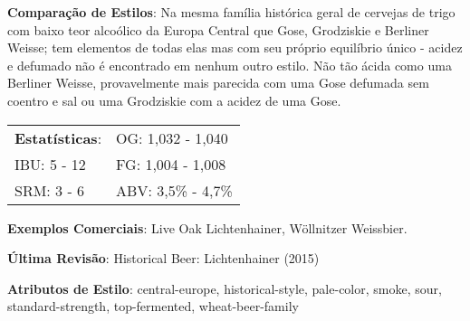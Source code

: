 \textbf{Comparação de Estilos}: Na mesma família histórica geral de cervejas de trigo com baixo teor alcoólico da Europa Central que Gose, Grodziskie e Berliner Weisse; tem elementos de todas elas mas com seu próprio equilíbrio único - acidez e defumado não é encontrado em nenhum outro estilo. Não tão ácida como uma Berliner Weisse, provavelmente mais parecida com uma Gose defumada sem coentro e sal ou uma Grodziskie com a acidez de uma Gose.

\begin{tabular}{@{}p{35mm}p{35mm}@{}}
  \textbf{Estatísticas}: & OG: 1,032 - 1,040  \\
  IBU: 5 - 12  & FG: 1,004 - 1,008  \\
  SRM: 3 - 6 & ABV: 3,5\% - 4,7\%
\end{tabular}

\textbf{Exemplos Comerciais}: Live Oak Lichtenhainer, Wöllnitzer Weissbier.

\textbf{Última Revisão}: Historical Beer: Lichtenhainer (2015)

\textbf{Atributos de Estilo}: central-europe, historical-style, pale-color, smoke, sour, standard-strength, top-fermented, wheat-beer-family